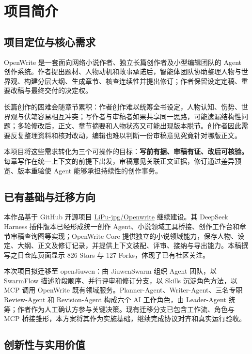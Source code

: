 \section{项目简介}

\subsection{项目定位与核心需求}

OpenWrite 是一套面向网络小说作者、独立长篇创作者及小型编辑团队的 Agent 创作系统。作者提出题材、人物动机和故事承诺后，智能体团队协助整理人物与世界观、构建分层大纲、生成章节、核查连续性并提出修订；作者保留设定定稿、重要改稿与最终交付的决定权。

长篇创作的困难会随章节累积：作者创作难以统筹全书设定，人物认知、伤势、世界观与伏笔容易相互冲突；写作者与审稿者如果共享同一思路，可能遗漏结构性问题；多轮修改后，正文、章节摘要和人物状态又可能出现版本脱节。创作者因此需要反复整理资料和核对改动，编辑也难以判断一份审稿意见究竟针对哪版正文。

本项目将这些需求转化为三个可操作的目标：\textbf{写前有据、审稿有证、改后可核验。}每章写作在统一上下文的前提下出发，审稿意见关联正文证据，修订通过差异预览、版本重验使 Agent 能够承担持续性的创作事务。

\subsection{已有基础与迁移方向}

本作品基于 GitHub 开源项目 \href{https://github.com/LiPu-jpg/Openwrite}{LiPu-jpg/Openwrite} 继续建设。其 DeepSeek Harness 插件版本已经形成统一创作 Agent、小说领域工具桥接、创作工作台和章节审稿查询图等实现；OpenWrite Core 提供独立的小说领域能力，保存人物、设定、大纲、正文及修订记录，并提供上下文装配、评审、接纳与导出能力。本稿撰写之日仓库页面显示 826 Stars 与 127 Forks，体现了已有社区关注。

本次项目拟迁移至 openJiuwen：由 JiuwenSwarm 组织 Agent 团队，以 SwarmFlow 描述阶段顺序、并行评审和修订分支，以 Skills 沉淀角色方法，以 MCP 调用 OpenWrite 既有领域服务。Planner-Agent、Writer-Agent、三名专职 Review-Agent 和 Revision-Agent 构成六个 AI 工作角色，由 Leader-Agent 统筹；作者作为人工确认方参与关键决策。现有迁移分支已包含工作流、角色与 MCP 桥接雏形，本方案将其作为实施基础，继续完成协议对齐和真实运行验收。

\subsection{创新性与实用价值}

